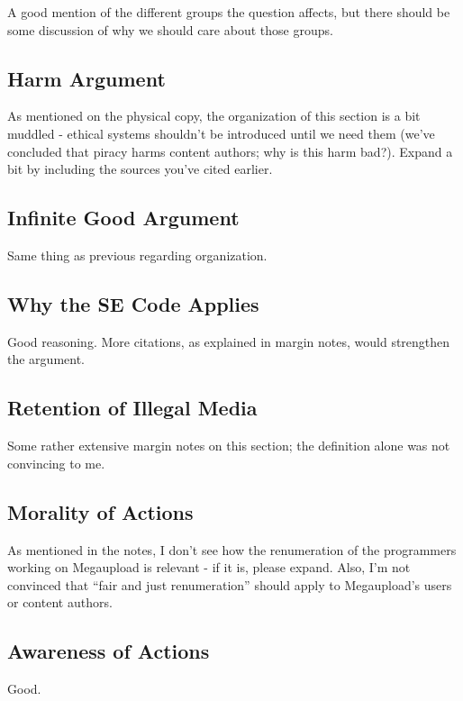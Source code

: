 \documentclass[11pt]{article}
\begin{document}
A good mention of the different groups the question affects, but there should be some discussion of why we should care about those groups.

\subsection{Harm Argument}

As mentioned on the physical copy, the organization of this section is a bit muddled - ethical systems shouldn't be introduced until we need them (we've concluded that piracy harms content authors; why is this harm bad?).  Expand a bit by including the sources you've cited earlier.

\subsection{Infinite Good Argument}

Same thing as previous regarding organization.

\subsection{Why the SE Code Applies}

Good reasoning.  More citations, as explained in margin notes, would strengthen the argument.

\subsection{Retention of Illegal Media}

Some rather extensive margin notes on this section; the definition alone was not convincing to me.

\subsection{Morality of Actions}

As mentioned in the notes, I don't see how the renumeration of the programmers working on Megaupload is relevant - if it is, please expand.  Also, I'm not convinced that ``fair and just renumeration'' should apply to Megaupload's users or content authors.

\subsection{Awareness of Actions}

Good.
\end{document}
